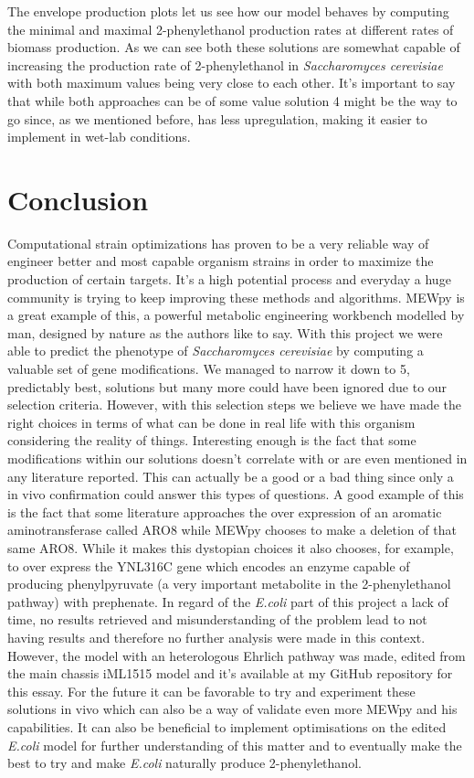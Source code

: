 \documentclass[runningheads]{llncs}
\begin{document}
The envelope production plots let us see how our model behaves by computing the minimal and maximal 2-phenylethanol production rates at different rates of biomass production. As we can see both these solutions are somewhat capable of increasing the production rate of 2-phenylethanol in \emph{Saccharomyces cerevisiae} with both maximum values being very close to each other. It's important to say that while both approaches can be of some value solution 4 might be the way to go since, as we mentioned before, has less upregulation, making it easier to implement in wet-lab conditions.
\section{Conclusion}
Computational strain optimizations has proven to be a very reliable way of engineer better and most capable organism strains in order to maximize the production of certain targets. It's a high potential process and everyday a huge community is trying to keep improving these methods and algorithms. MEWpy is a great example of this, a powerful metabolic engineering workbench modelled by man, designed by nature as the authors like to say.
With this project we were able to predict the phenotype of \emph{Saccharomyces cerevisiae} by computing a valuable set of gene modifications. We managed to narrow it down to 5, predictably best, solutions but many more could have been ignored due to our selection criteria. However, with this selection steps we believe we have made the right choices in terms of what can be done in real life with this organism considering the reality of things.
Interesting enough is the fact that some modifications within our solutions doesn't correlate with or are even mentioned in any literature reported. This can actually be a good or a bad thing since only a in vivo confirmation could answer this types of questions. A good example of this is the fact that some literature approaches the over expression of an aromatic aminotransferase called ARO8 while MEWpy chooses to make a deletion of that same ARO8. While it makes this dystopian choices it also chooses, for example, to over express the YNL316C gene which encodes an enzyme capable of producing phenylpyruvate (a very important metabolite in the 2-phenylethanol pathway) with prephenate.
In regard of the \emph{E.coli} part of this project a lack of time, no results retrieved and misunderstanding of the problem lead to not having results and therefore no further analysis were made in this context. However, the model with an heterologous Ehrlich pathway was made, edited from the main chassis iML1515 model and it's available at my GitHub repository for this essay.
For the future it can be favorable to try and experiment these solutions in vivo which can also be a way of validate even more MEWpy and his capabilities. It can also be beneficial to implement optimisations on the edited \emph{E.coli} model for further understanding of this matter and to eventually make the best to try and make \emph{E.coli} naturally produce 2-phenylethanol.
\end{document}
